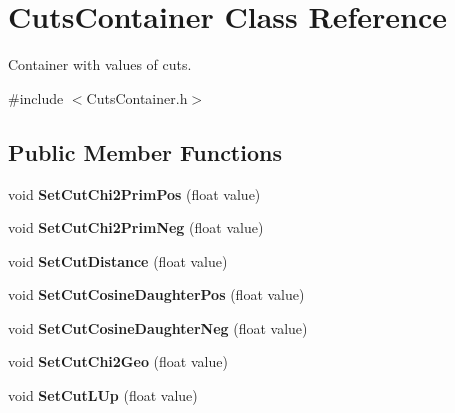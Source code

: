 \hypertarget{classCutsContainer}{}\section{Cuts\+Container Class Reference}
\label{classCutsContainer}


Container with values of cuts.  




{\ttfamily \#include $<$Cuts\+Container.\+h$>$}

\subsection*{Public Member Functions}
\begin{DoxyCompactItemize}
\item 
void {\bfseries Set\+Cut\+Chi2\+Prim\+Pos} (float value)\hypertarget{classCutsContainer_a2d97b84d79e61e4f51809d6ea70a56e2}{}\label{classCutsContainer_a2d97b84d79e61e4f51809d6ea70a56e2}

\item 
void {\bfseries Set\+Cut\+Chi2\+Prim\+Neg} (float value)\hypertarget{classCutsContainer_af6b11dffbdd5c07e5f02a3307ed38722}{}\label{classCutsContainer_af6b11dffbdd5c07e5f02a3307ed38722}

\item 
void {\bfseries Set\+Cut\+Distance} (float value)\hypertarget{classCutsContainer_aaf10c92b70c8856a7299c6edc9a87189}{}\label{classCutsContainer_aaf10c92b70c8856a7299c6edc9a87189}

\item 
void {\bfseries Set\+Cut\+Cosine\+Daughter\+Pos} (float value)\hypertarget{classCutsContainer_a08bb845205b03be7033b660352f478c8}{}\label{classCutsContainer_a08bb845205b03be7033b660352f478c8}

\item 
void {\bfseries Set\+Cut\+Cosine\+Daughter\+Neg} (float value)\hypertarget{classCutsContainer_a3527c1efe67996811604eb77a39cda01}{}\label{classCutsContainer_a3527c1efe67996811604eb77a39cda01}

\item 
void {\bfseries Set\+Cut\+Chi2\+Geo} (float value)\hypertarget{classCutsContainer_ad4af169e5ceb1dde30d3afdd6f3ffd25}{}\label{classCutsContainer_ad4af169e5ceb1dde30d3afdd6f3ffd25}

\item 
void {\bfseries Set\+Cut\+L\+Up} (float value)\hypertarget{classCutsContainer_ab0ec45fbcc4a2bf001728a0a4688a3f9}{}\label{classCutsContainer_ab0ec45fbcc4a2bf001728a0a4688a3f9}


\end{DoxyCompactItemize}
